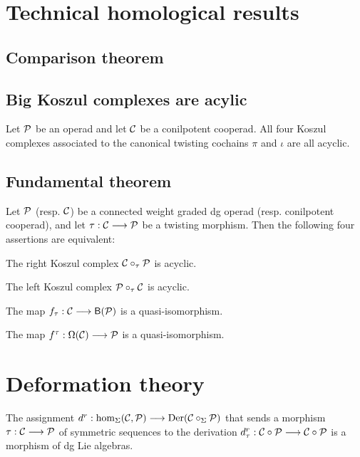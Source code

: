 
\section{Technical homological results}

\subsection{Comparison theorem}

\subsection{Big Koszul complexes are acylic}

\begin{theorem}\label{thm:augacyclic}
Let ${\mathcal{P}}$ be an operad and let $\mathcal{C}$ be a conilpotent cooperad. All four
Koszul complexes associated to the canonical twisting cochains
$\pi$ and $\iota$ are all acyclic. 
\end{theorem}
\subsection{Fundamental theorem}

\begin{theorem}\label{thm:fundamental}
Let ${\mathcal{P}}$ (resp. $\mathcal{C}$) be a connected weight graded dg operad
(resp. conilpotent cooperad), and let $\tau : \mathcal{C}\longrightarrow
{\mathcal{P}}$ be a twisting morphism. Then the following four assertions are
equivalent:
\begin{tenumerate}
\item The right Koszul complex $\mathcal{C}\circ_\tau {\mathcal{P}}$ is acyclic.
\item The left Koszul complex ${\mathcal{P}}\circ_\tau \mathcal{C}$ is acyclic.
\item The map $f_\tau : \mathcal{C}\longrightarrow \mathsf{B}({\mathcal{P}})$ is a quasi-isomorphism.
\item The map $f^\tau : \Omega(\mathcal{C})\longrightarrow {\mathcal{P}}$ is a quasi-isomorphism.
\end{tenumerate}
\end{theorem}

\section{Deformation theory}

\begin{proposition}
The assignment
$
d^r : \hom_\Sigma(\mathcal{C},{\mathcal{P}})
 	\longrightarrow 
 	\operatorname{Der}(\mathcal{C}\circ_\Sigma {\mathcal{P}})
$ that sends 
a morphism $\tau : \mathcal{C}\longrightarrow {\mathcal{P}}$ of symmetric
sequences to the derivation $d_\tau^r : \mathcal{C}\circ{\mathcal{P}} \longrightarrow
\mathcal{C}\circ {\mathcal{P}}$ is a morphism of dg Lie algebras.
\end{proposition}


